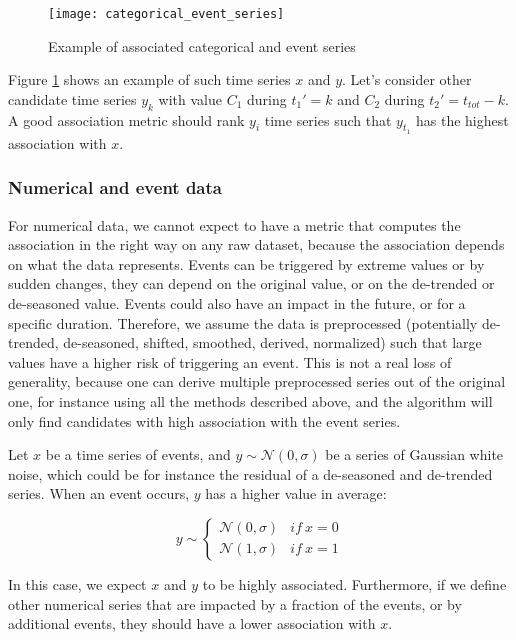 \documentclass[12pt,a4paper]{article}
\begin{document}
\begin{figure}[h]
\centering
\texttt{[image: categorical\_event\_series]}
\caption{Example of associated categorical and event series}
\label{fig:categorical_event_series}
\end{figure}

Figure \ref{fig:categorical_event_series} shows an example of such time series $x$ and $y$.
Let's consider other candidate time series $y_k$ with value $C_1$ during $t_1'=k$ and $C_2$ during $t_2'=t_{tot}-k$. 
A good association metric should rank $y_i$ time series such that $y_{t_1}$ has the highest association with $x$. 

\subsubsection{Numerical and event data}

For numerical data, we cannot expect to have a metric that computes the association in the right way on any raw dataset, because the association depends on what the data represents. 
Events can be triggered by extreme values or by sudden changes, they can depend on the original value, or on the de-trended or de-seasoned value. 
Events could also have an impact in the future, or for a specific duration. 
Therefore, we assume the data is preprocessed (potentially de-trended, de-seasoned, shifted, smoothed, derived, normalized) such that large values have a higher risk of triggering an event. 
This is not a real loss of generality, because one can derive multiple preprocessed series out of the original one, for instance using all the methods described above, and the algorithm will only find candidates with high association with the event series.

Let $x$ be a time series of events, and $y \sim \mathcal{N}(0, \sigma)$ be a series of Gaussian white noise, which could be for instance the residual of a de-seasoned and de-trended series. When an event occurs, $y$ has a higher value in average:

$$
y \sim \left\{
\begin{array}{ll}
\mathcal{N}(0, \sigma) & if\ x = 0 \\
\mathcal{N}(1, \sigma) & if\ x = 1
 \end{array}\right.
$$

In this case, we expect $x$ and $y$ to be highly associated. Furthermore, if we define other numerical series that are impacted by a fraction of the events, or by additional events, they should have a lower association with $x$.
\end{document}
